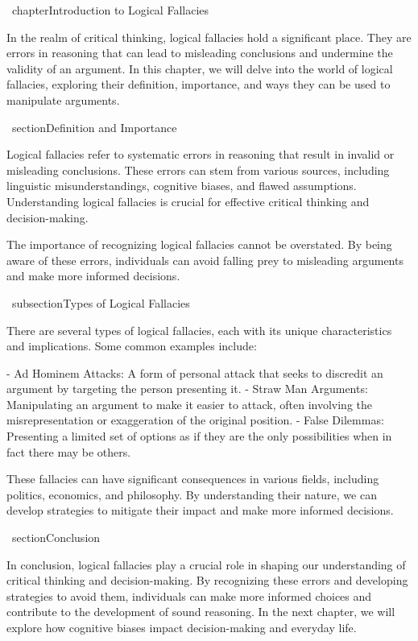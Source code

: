 \ chapter{Introduction to Logical Fallacies}

In the realm of critical thinking, logical fallacies hold a significant place. They are errors in reasoning that can lead to misleading conclusions and undermine the validity of an argument. In this chapter, we will delve into the world of logical fallacies, exploring their definition, importance, and ways they can be used to manipulate arguments.

\ section{Definition and Importance}

Logical fallacies refer to systematic errors in reasoning that result in invalid or misleading conclusions. These errors can stem from various sources, including linguistic misunderstandings, cognitive biases, and flawed assumptions. Understanding logical fallacies is crucial for effective critical thinking and decision-making.

The importance of recognizing logical fallacies cannot be overstated. By being aware of these errors, individuals can avoid falling prey to misleading arguments and make more informed decisions.

\ subsection{Types of Logical Fallacies}

There are several types of logical fallacies, each with its unique characteristics and implications. Some common examples include:

- Ad Hominem Attacks: A form of personal attack that seeks to discredit an argument by targeting the person presenting it.
- Straw Man Arguments: Manipulating an argument to make it easier to attack, often involving the misrepresentation or exaggeration of the original position.
- False Dilemmas: Presenting a limited set of options as if they are the only possibilities when in fact there may be others.

These fallacies can have significant consequences in various fields, including politics, economics, and philosophy. By understanding their nature, we can develop strategies to mitigate their impact and make more informed decisions.

\ section{Conclusion}

In conclusion, logical fallacies play a crucial role in shaping our understanding of critical thinking and decision-making. By recognizing these errors and developing strategies to avoid them, individuals can make more informed choices and contribute to the development of sound reasoning. In the next chapter, we will explore how cognitive biases impact decision-making and everyday life.